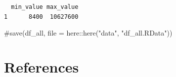 \documentclass[
  english,
  letterpaper,
  DIV=11,
  numbers=noendperiod]{scrreprt}
\newenvironment{Shaded}{\begin{snugshade}}{\end{snugshade}}
\newcommand{\CommentTok}[1]{\textcolor[rgb]{0.37,0.37,0.37}{#1}}
\begin{document}
\begin{verbatim}
  min_value max_value
1      8400  10627600
\end{verbatim}

\begin{Shaded}
\begin{Highlighting}[]
\CommentTok{\#save(df\_all, file = here::here("data", "df\_all.RData"))}
\end{Highlighting}
\end{Shaded}


\chapter*{References}\label{references}


\protect{}\label{refs}
\end{document}
